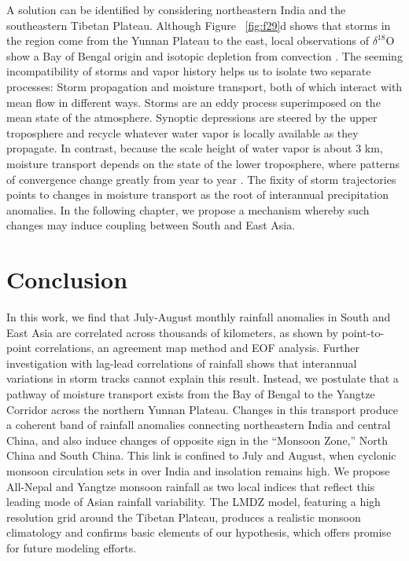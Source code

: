 	 A solution can be identified by considering northeastern India and the southeastern Tibetan Plateau. Although Figure ~\ref{fig:f29}d shows that storms in the region come from the Yunnan Plateau to the east, local observations of $\delta^{18}$O show a Bay of Bengal origin and isotopic depletion from convection \parencite{Gao2011}. The seeming incompatibility of storms and vapor history helps us to isolate two separate processes: Storm propagation and moisture transport, both of which interact with mean flow in different ways. Storms are an eddy process superimposed on the mean state of the atmosphere. Synoptic depressions are steered by the upper troposphere and recycle whatever water vapor is locally available as they propagate. In contrast, because the scale height of water vapor is about 3 km, moisture transport depends on the state of the lower troposphere, where patterns of convergence change greatly from year to year \parencite{Annamalai2001,Yoon2005}. The fixity of storm trajectories points to changes in moisture transport as the root of interannual precipitation anomalies. In the following chapter, we propose a mechanism whereby such changes may induce coupling between South and East Asia.
	 

\section{Conclusion}

	In this work, we find that July-August monthly rainfall anomalies in South and East Asia are correlated across thousands of kilometers, as shown by point-to-point correlations, an agreement map method and EOF analysis. Further investigation with lag-lead correlations of rainfall shows that interannual variations in storm tracks cannot explain this result. Instead, we postulate that a pathway of moisture transport exists from the Bay of Bengal to the Yangtze Corridor across the northern Yunnan Plateau. Changes in this transport produce a coherent band of rainfall anomalies connecting northeastern India and central China, and also induce changes of opposite sign in the ``Monsoon Zone,'' North China and South China. This link is confined to July and August, when cyclonic monsoon circulation sets in over India and insolation remains high. We propose All-Nepal and Yangtze monsoon rainfall as two local indices that reflect this leading mode of Asian rainfall variability. The LMDZ model, featuring a high resolution grid around the Tibetan Plateau, produces a realistic monsoon climatology and confirms basic elements of our hypothesis, which offers promise for future modeling efforts.
	
